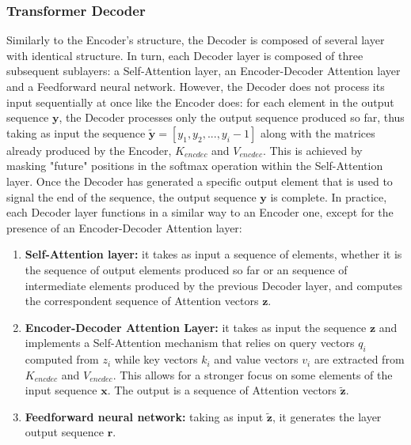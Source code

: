             \subsubsection{Transformer Decoder}
            \label{subsub:trans_decoder}
                Similarly to the Encoder's structure, the Decoder is composed of several layer with identical structure. In turn, each Decoder layer is composed of three subsequent sublayers: a Self-Attention layer, an Encoder-Decoder Attention layer and a Feedforward neural network. However, the Decoder does not process its input sequentially at once like the Encoder does: for each element in the output sequence $\mathbf{y}$, the Decoder processes only the output sequence produced so far, thus taking as input the sequence $\mathbf{\tilde{y}} = [y_1, y_2, ..., y_i-1]$ along with the matrices already produced by the Encoder, $K_{encdec}$ and $V_{encdec}$. This is achieved by masking "future" positions in the softmax operation within the Self-Attention layer. Once the Decoder has generated a specific output element that is used to signal the end of the sequence, the output sequence $\mathbf{y}$ is complete. \newline
                In practice, each Decoder layer functions in a similar way to an Encoder one, except for the presence of an Encoder-Decoder Attention layer:
                \begin{enumerate}
                    \item \textbf{Self-Attention layer:} it takes as input a sequence of elements, whether it is the sequence of output elements produced so far or an sequence of intermediate elements produced by the previous Decoder layer, and computes the correspondent sequence of Attention vectors $\mathbf{z}$.
                    \item \textbf{Encoder-Decoder Attention Layer:} it takes as input the sequence $\mathbf{z}$ and implements a Self-Attention mechanism that relies on query vectors $q_i$ computed from $z_i$ while key vectors $k_i$ and value vectors $v_i$ are extracted from $K_{encdec}$ and $V_{encdec}$. This allows for a stronger focus on some elements of the input sequence $\mathbf{x}$. The output is a sequence of Attention vectors $\mathbf{\tilde{z}}$.
                    \item \textbf{Feedforward neural network:} taking as input $\mathbf{\tilde{z}}$, it generates the layer output sequence $\mathbf{r}$.
                \end{enumerate}
                

